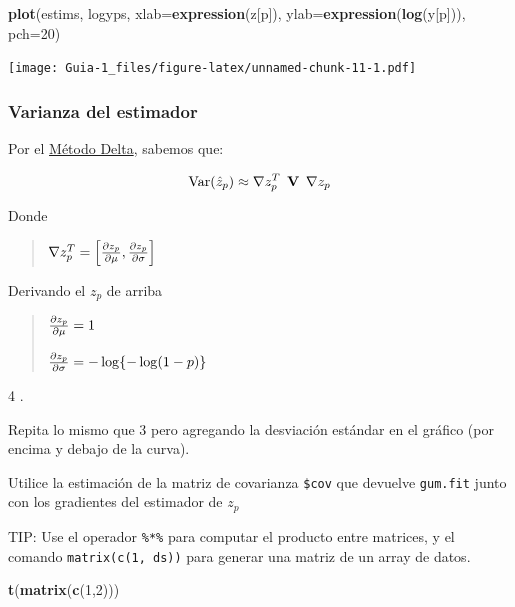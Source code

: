 \documentclass[
]{article}
\newenvironment{Shaded}{\begin{snugshade}}{\end{snugshade}}
\newcommand{\DataTypeTok}[1]{\textcolor[rgb]{0.13,0.29,0.53}{#1}}
\newcommand{\DecValTok}[1]{\textcolor[rgb]{0.00,0.00,0.81}{#1}}
\newcommand{\KeywordTok}[1]{\textcolor[rgb]{0.13,0.29,0.53}{\textbf{#1}}}
\newcommand{\NormalTok}[1]{#1}
\begin{document}
\begin{Shaded}
\begin{Highlighting}[]
\KeywordTok{plot}\NormalTok{(estims, logyps, }\DataTypeTok{xlab=}\KeywordTok{expression}\NormalTok{(z[p]), }\DataTypeTok{ylab=}\KeywordTok{expression}\NormalTok{(}\KeywordTok{log}\NormalTok{(y[p])), }\DataTypeTok{pch=}\DecValTok{20}\NormalTok{)}
\end{Highlighting}
\end{Shaded}

\texttt{[image: Guia-1\_files/figure-latex/unnamed-chunk-11-1.pdf]}

\hypertarget{varianza-del-estimador}{%
\subsubsection{Varianza del estimador}\label{varianza-del-estimador}}

Por el \href{https://es.wikipedia.org/wiki/M\%C3\%A9todo_delta}{Método
Delta}, sabemos que:

\[\Large \mathrm{Var}(\hat z_p)\approx \nabla z_p^T \ \mathbf V \ \nabla z_p\]

Donde

\begin{quote}
\(\large \nabla z_p^T = \left[ \frac{\partial z_p}{\partial \mu},\frac{\partial z_p}{\partial \sigma} \right]\)
\end{quote}

Derivando el \(z_p\) de arriba

\begin{quote}
\(\large \frac{\partial z_p}{\partial \mu} = 1\)

\(\large \frac{\partial z_p}{\partial \sigma} = -\log\{ -\log (1-p)\}\)
\end{quote}

4 .

Repita lo mismo que 3 pero agregando la desviación estándar en el
gráfico (por encima y debajo de la curva).

Utilice la estimación de la matriz de covarianza \texttt{\$cov} que
devuelve \texttt{gum.fit} junto con los gradientes del estimador de
\(z_p\)

TIP: Use el operador \texttt{\%*\%} para computar el producto entre
matrices, y el comando \texttt{matrix(c(1,\ ds))} para generar una
matriz de un array de datos.

\begin{Shaded}
\begin{Highlighting}[]
\KeywordTok{t}\NormalTok{(}\KeywordTok{matrix}\NormalTok{(}\KeywordTok{c}\NormalTok{(}\DecValTok{1}\NormalTok{,}\DecValTok{2}\NormalTok{)))}
\end{Highlighting}
\end{Shaded}
\end{document}
